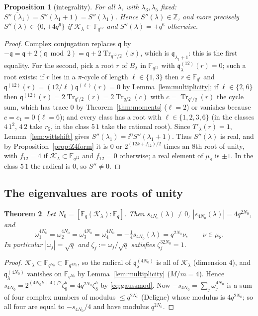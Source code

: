 ﻿\documentclass[12pt,a4paper]{amsart}
\newtheorem{theorem}{Theorem}[section]
\newtheorem{proposition}[theorem]{Proposition}
\theoremstyle{definition}
\newcommand{\F}{\mathbb{F}}
\newcommand{\Z}{\mathbb{Z}}
\newcommand{\Tr}{\operatorname{Tr}}
\newcommand{\Kk}{\mathcal{K}}
\newcommand{\qq}{\mathfrak{q}}
\newcommand{\Spp}{S''}
\begin{document}
\begin{proposition}[integrality]\label{prop:real}
For all $\lambda$, with $\lambda_3,\lambda_5$ fixed: $\overline{\Spp(\lambda_1)}=\Spp(\lambda_1+1)=\Spp(\lambda_1)$. Hence $\Spp(\lambda)\in\Z$, and more precisely $\Spp(\lambda)\in\{0,\pm4q^6\}$ if $\Kk_\lambda\subset\F_{q^{12}}$ and $\Spp(\lambda)=\pm q^6$ otherwise.
\end{proposition}
\begin{proof}
Complex conjugation replaces $\qq$ by $-\qq=\qq+2(\qq\bmod2)=\qq+2\Tr_{q^{12}/2}(x)$, which is $\qq_{\lambda_1+1}$: this is the first equality. For the second, pick a root $r$ of $B_\lambda$ in $\F_{q^{12}}$ with $\qq^{(12)}_\lambda(r)=0$; such a root exists: if $r$ lies in a $\pi$-cycle of length $\ell\in\{1,3\}$ then $r\in\F_{q^\ell}$ and $\qq^{(12)}(r)=(12/\ell)\qq^{(\ell)}(r)=0$ by Lemma~\ref{lem:multiplicity}; if $\ell\in\{2,6\}$ then $\qq^{(12)}(r)=2\Tr_{q^\ell/2}(r)=2\Tr_{q/2}(c)$ with $c=\Tr_{q^\ell/q}(r)$ the cycle sum, which has trace $0$ by Theorem~\ref{thm:moments} ($\ell=2$) or vanishes because $c=e_1=0$ ($\ell=6$); and every class has a root with $\ell\in\{1,2,3,6\}$ (in the classes $4\,1^2$, $4\,2$ take $r_5$, in the class $5\,1$ take the rational root). Since $T'_\lambda(r)=1$, Lemma~\ref{lem:wittshift} gives $\Spp(\lambda_1)=i^{0}\Spp(\lambda_1+1)$. Thus $\Spp(\lambda)$ is real, and by Proposition~\ref{prop:Z4form} it is $0$ or $2^{(12k+f_{12})/2}$ times an $8$th root of unity, with $f_{12}=4$ if $\Kk_\lambda\subset\F_{q^{12}}$ and $f_{12}=0$ otherwise; a real element of $\mu_8$ is $\pm1$. In the class $5\,1$ the radical is $0$, so $\Spp\ne0$.
\end{proof}

\subsection{The eigenvalues are roots of unity}
\begin{theorem}\label{thm:rootsofunity}
Let $N_0=[\F_q(\Kk_\lambda):\F_q]$. Then $s_{4N_0}(\lambda)\ne0$, $|s_{4N_0}(\lambda)|=4q^{2N_0}$, and
\[
\omega_1^{4N_0}=\omega_2^{4N_0}=\omega_3^{4N_0}=\omega_4^{4N_0}=-\tfrac14s_{4N_0}(\lambda)=q^{2N_0}\nu,\qquad \nu\in\mu_8 .
\]
In particular $|\omega_j|=\sqrt q$ and $\zeta_j:=\omega_j/\sqrt q$ satisfies $\zeta_j^{32N_0}=1$.
\end{theorem}
\begin{proof}
$\Kk_\lambda\subset\F_{q^{N_0}}\subset\F_{q^{4N_0}}$, so the radical of $\qq^{(4N_0)}_\lambda$ is all of $\Kk_\lambda$ (dimension $4$), and $\qq^{(4N_0)}_\lambda$ vanishes on $\F_{q^{N_0}}$ by Lemma~\ref{lem:multiplicity} ($M/m=4$). Hence $s_{4N_0}=2^{(4N_0k+4)/2}\zeta_8^b=4q^{2N_0}\zeta_8^b$ by \eqref{eq:gaussmod}. Now $-s_{4N_0}=\sum_j\omega_j^{4N_0}$ is a sum of four complex numbers of modulus $\le q^{2N_0}$ (Deligne) whose modulus is $4q^{2N_0}$; so all four are equal to $-s_{4N_0}/4$ and have modulus $q^{2N_0}$.
\end{proof}
\end{document}
